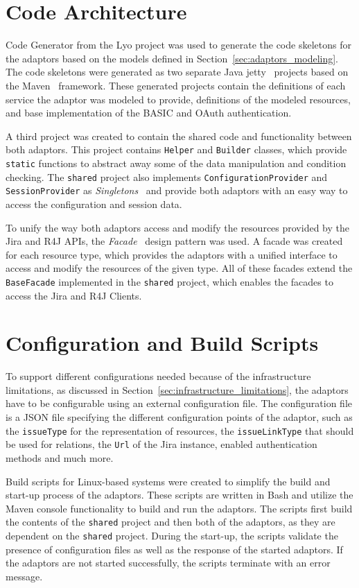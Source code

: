 \section{Code Architecture}
Code Generator from the Lyo project was used to generate the code skeletons for the adaptors based on the models defined in Section \ref{sec:adaptors_modeling}. The code skeletons were generated as two separate Java jetty \cite{jetty} projects based on the Maven \cite{maven} framework. These generated projects contain the definitions of each service the adaptor was modeled to provide, definitions of the modeled resources, and base implementation of the BASIC and OAuth authentication.

A third project was created to contain the shared code and functionality between both adaptors. This project contains \texttt{Helper} and \texttt{Builder} classes, which provide \texttt{static} functions to abstract away some of the data manipulation and condition checking. The \texttt{shared} project also implements \texttt{ConfigurationProvider} and \texttt{SessionProvider} as \emph{Singletons} \cite{singleton_design_pattern} and provide both adaptors with an easy way to access the configuration and session data.

To unify the way both adaptors access and modify the resources provided by the Jira and R4J APIs, the \emph{Facade} \cite{facade_design_pattern} design pattern was used. A facade was created for each resource type, which provides the adaptors with a unified interface to access and modify the resources of the given type. All of these facades extend the \texttt{BaseFacade} implemented in the \texttt{shared} project, which enables the facades to access the Jira and R4J Clients.

\section{Configuration and Build Scripts}
To support different configurations needed because of the infrastructure limitations, as discussed in Section \ref{sec:infrastructure_limitations}, the adaptors have to be configurable using an external configuration file. The configuration file is a JSON file specifying the different configuration points of the adaptor, such as the \texttt{issueType} for the representation of resources, the \texttt{issueLinkType} that should be used for relations, the \texttt{Url} of the Jira instance, enabled authentication methods and much more.

Build scripts for Linux-based systems were created to simplify the build and start-up process of the adaptors. These scripts are written in Bash and utilize the Maven console functionality to build and run the adaptors. The scripts first build the contents of the \texttt{shared} project and then both of the adaptors, as they are dependent on the \texttt{shared} project. During the start-up, the scripts validate the presence of configuration files as well as the response of the started adaptors. If the adaptors are not started successfully, the scripts terminate with an error message.

